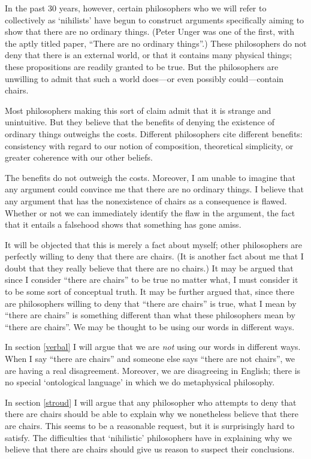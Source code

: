 \documentclass[11pt]{article}
\begin{document}
\begin{spacing}{1.5}
In the past 30 years, however, certain philosophers who we will refer
to collectively as `nihilists' have begun to construct arguments
specifically aiming to show that there are no ordinary things.  (Peter
Unger was one of the first, with the aptly titled paper, ``There are
no ordinary things''.)  These philosophers do not deny that there is
an external world, or that it contains many physical things; these
propositions are readily granted to be true.  But the philosophers are
unwilling to admit that such a world does---or even possibly
could---contain chairs.

Most philosophers making this sort of claim admit that it is strange
and unintuitive.  But they believe that the benefits of denying the
existence of ordinary things outweighs the costs.  Different
philosophers cite different benefits: consistency with regard to our
notion of composition, theoretical simplicity, or greater coherence
with our other beliefs.

The benefits do not outweigh the costs.  Moreover, I am unable to
imagine that any argument could convince me that there are no ordinary
things.  I believe that any argument that has the nonexistence of
chairs as a consequence is flawed.  Whether or not we can immediately
identify the flaw in the argument, the fact that it entails a
falsehood shows that something has gone amiss.

It will be objected that this is merely a fact about myself; other
philosophers are perfectly willing to deny that there are chairs.  (It
is another fact about me that I doubt that they really believe that
there are no chairs.)  It may be argued that since I consider ``there
are chairs'' to be true no matter what, I must consider it to be some
sort of conceptual truth.  It may be further argued that, since there
are philosophers willing to deny that ``there are chairs'' is true,
what I mean by ``there are chairs'' is something different than what
these philosophers mean by ``there are chairs''.  We may be thought to
be using our words in different ways.

In section \ref{verbal} I will argue that we are {\em not} using our
words in different ways.  When I say ``there are chairs'' and someone
else says ``there are not chairs'', we are having a real disagreement.
Moreover, we are disagreeing in English; there is no special
`ontological language' in which we do metaphysical philosophy.

In section \ref{stroud} I will argue that any philosopher who attempts
to deny that there are chairs should be able to explain why we
nonetheless believe that there are chairs.  This seems to be a
reasonable request, but it is surprisingly hard to satisfy.  The
difficulties that `nihilistic' philosophers have in explaining why we
believe that there are chairs should give us reason to suspect their
conclusions.


\end{spacing}
\end{document}
